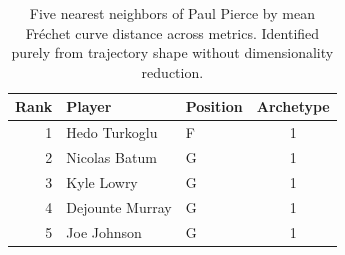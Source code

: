 \begin{table}[htbp]
  \centering\small
  \begin{tabular}{rllc}
    \toprule
    Rank & Player & Position & Archetype \\
    \midrule
    1 & Hedo Turkoglu & F & 1 \\
    2 & Nicolas Batum & G & 1 \\
    3 & Kyle Lowry & G & 1 \\
    4 & Dejounte Murray & G & 1 \\
    5 & Joe Johnson & G & 1 \\
    \bottomrule
  \end{tabular}
  \caption{Five nearest neighbors of Paul Pierce by mean Fr\'{e}chet curve distance across metrics. Identified purely from trajectory shape without dimensionality reduction.}
  \label{tab:Paul_Pierce_frechet_curve_neighbors}
\end{table}

